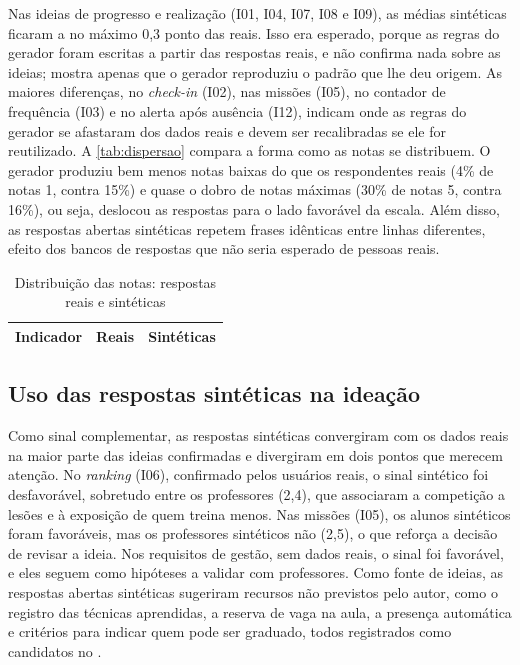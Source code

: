Nas ideias de progresso e realização (I01, I04, I07, I08 e I09), as
médias sintéticas ficaram a no máximo 0,3 ponto das reais. Isso era esperado,
porque as regras do gerador foram escritas a partir das respostas reais, e
não confirma nada sobre as ideias; mostra apenas que o gerador reproduziu
o padrão que lhe deu origem. As maiores diferenças, no \textit{check-in}
(I02), nas missões (I05), no contador de frequência (I03) e no alerta após
ausência (I12), indicam onde as regras do gerador se afastaram dos dados
reais e devem ser recalibradas se ele for reutilizado. A
\autoref{tab:dispersao} compara a forma como as notas se distribuem. O
gerador produziu bem menos notas baixas do que os respondentes reais
(4\% de notas 1, contra 15\%) e quase o dobro de notas máximas (30\%
de notas 5, contra 16\%), ou seja, deslocou as respostas para o lado
favorável da escala. Além disso, as respostas abertas sintéticas repetem
frases idênticas entre linhas diferentes, efeito dos bancos de respostas
que não seria esperado de pessoas reais.

\begin{table}[H]
  \centering
  \caption{Distribuição das notas: respostas reais e sintéticas}
  \label{tab:dispersao}
  \footnotesize
  \begin{tabular}{lcc}
    \toprule
    \textbf{Indicador} & \textbf{Reais} & \textbf{Sintéticas} \\
    \midrule
  \end{tabular}
\end{table}

\subsection{Uso das respostas sintéticas na ideação}

Como sinal complementar, as respostas sintéticas convergiram com os dados
reais na maior parte das ideias confirmadas e divergiram em dois pontos
que merecem atenção. No \textit{ranking} (I06), confirmado pelos usuários
reais, o sinal sintético foi desfavorável, sobretudo entre os professores
(2,4), que associaram a competição a lesões e à exposição de quem treina
menos. Nas missões (I05), os alunos sintéticos foram favoráveis, mas os
professores sintéticos não (2,5), o que reforça a decisão de revisar a
ideia. Nos requisitos de gestão, sem dados reais, o sinal foi favorável,
e eles seguem como hipóteses a validar com professores. Como fonte de
ideias, as respostas abertas sintéticas sugeriram recursos não previstos
pelo autor, como o registro das técnicas aprendidas, a reserva de vaga na
aula, a presença automática e critérios para indicar quem pode ser
graduado, todos registrados como candidatos no
.

